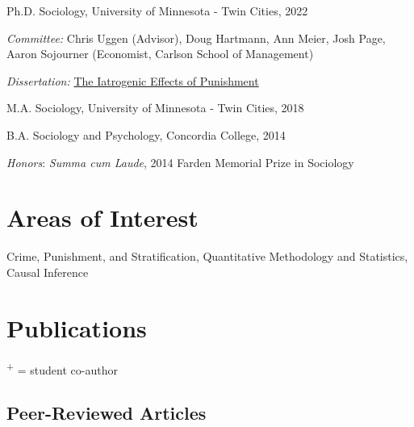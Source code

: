 \documentclass[letterpaper]{article}
\renewenvironment{itemize}{
  \begin{list}{}{
    \setlength{\leftmargin}{1.5em}
  }
}{
  \end{list}
}
\begin{document}
\begin{itemize}
  \item Ph.D. Sociology, University of Minnesota - Twin Cities, 2022
   \begin{itemize}
	\item \textit{Committee:} Chris Uggen (Advisor),  Doug Hartmann, Ann Meier, Josh Page, Aaron Sojourner (Economist, Carlson School of Management)
           \item \textit{Dissertation:} \href{https://conservancy.umn.edu/bitstream/handle/11299/243159/Larson_umn_0130E_23712.pdf?sequence=1}{The Iatrogenic Effects of Punishment}
\end{itemize}
    
\item M.A. Sociology, University of Minnesota - Twin Cities, 2018

 \item B.A. Sociology and Psychology, Concordia College, 2014
 \begin{itemize}
     \item \textit{Honors}: \textit{Summa cum Laude}, 2014 Farden Memorial Prize in Sociology
    \end{itemize}
\end{itemize}

\section*{\textbf{Areas of Interest}}

Crime, Punishment, and Stratification, Quantitative Methodology and Statistics, Causal Inference


\section*{\textbf{Publications}} \textsuperscript{+} = student co-author

\subsection*{Peer-Reviewed Articles}
\end{document}
